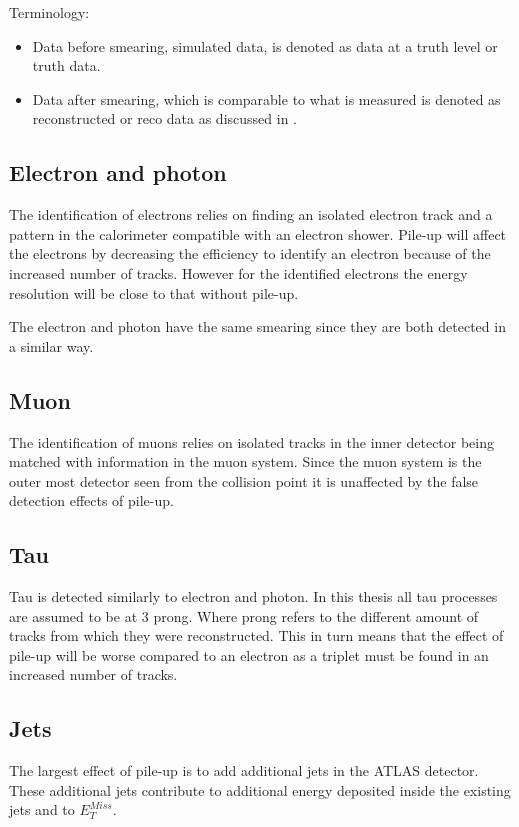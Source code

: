 Terminology:
\begin{itemize}
\item Data before smearing, simulated data, is denoted as data at a truth level or truth data.
\item Data after smearing, which is comparable to what is measured is denoted as reconstructed or reco data as discussed in .
\end{itemize}

\subsection{Electron and photon}
The identification of electrons relies on finding an isolated electron track and a pattern in the calorimeter compatible with an electron shower. Pile-up will affect the electrons by decreasing the efficiency to identify an electron because of the increased number of tracks. However for the identified electrons the energy resolution will be close to that without pile-up.

The electron and photon have the same smearing since they are both detected in a similar way. 

\subsection{Muon}
The identification of muons relies on isolated tracks in the inner detector  being matched with information in the muon system. Since the muon system is the outer most detector seen from the collision point it is unaffected by the false detection effects of pile-up.  
\subsection{Tau}\label{sec:smear:subsec:tau}
Tau is detected similarly to electron and photon.
In this thesis all tau processes are assumed to be at 3 prong. Where prong refers to the different amount of tracks from which they were reconstructed. This in turn means that the effect of pile-up will be worse compared to an electron as a triplet must be found in an increased number of tracks.
\subsection{Jets}
The largest effect of pile-up is to add additional jets in the ATLAS detector. These additional jets contribute to additional energy deposited inside the existing jets and to $E^{Miss}_T$.

